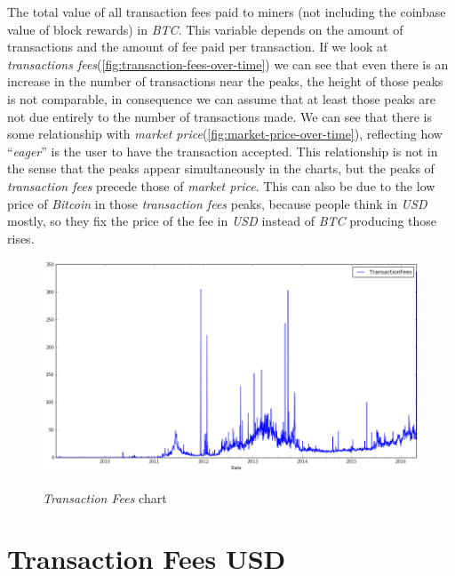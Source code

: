 The total value of all transaction fees paid to miners (not including
the coinbase value of block rewards) in \textit{BTC}. This variable
depends on the amount of transactions and the amount of fee paid per
transaction. If we look at \textit{transactions
fees}(\autoref{fig:transaction-fees-over-time}) we can see that even
there is an increase in the number of transactions near the peaks, the
height of those peaks is not comparable, in consequence we can assume
that at least those peaks are not due entirely to the number of
transactions made. We can see that there is some relationship with
\textit{market price}(\autoref{fig:market-price-over-time}),
reflecting how ``\textit{eager}'' is the user to have the transaction
accepted. This relationship is not in the sense that the peaks appear
simultaneously in the charts, but the peaks of \textit{transaction
fees} precede those of \textit{market price}. This can also be due to
the low price of \textit{Bitcoin} in those \textit{transaction fees}
peaks, because people think in \textit{USD} mostly, so they fix the
price of the fee in \textit{USD} instead of \textit{BTC} producing
those rises.

\begin{figure}[bth]
  \myfloatalign
  {\includegraphics[width=1\linewidth]
    {gfx/transaction-fees-over-time}}
  \caption{\textit{Transaction Fees} chart}
  \label{fig:transaction-fees-over-time}
\end{figure}


\section{Transaction Fees USD}
\label{sec:transaction-fees-usd}

